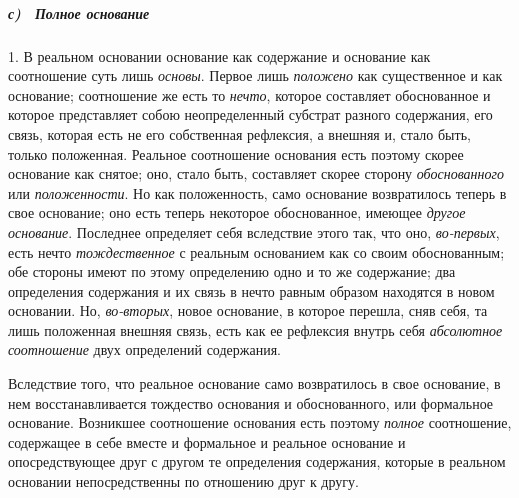 \subparagraph[с) \ Полное основание]{с) \ Полное основание}
1. В реальном основании основание как содержание
и основание как соотношение суть лишь {\em основы}.
Первое лишь {\em положено} как существенное и как
основание; соотношение же есть то {\em нечто}, которое
составляет обоснованное и которое представляет собою неопределенный
субстрат разного содержания, его связь, которая есть не его собственная
рефлексия, а внешняя и, стало быть, только положенная. Реальное соотношение
основания есть поэтому скорее основание как снятое; оно, стало быть,
составляет скорее сторону {\em обоснованного} или
{\em положенности}. Но как положенность, само основание
возвратилось теперь в свое основание; оно есть теперь некоторое
обоснованное, имеющее {\em другое основание}. Последнее
определяет себя вследствие этого так, что оно,
{\em во-первых}, есть нечто
{\em тождественное} с реальным основанием как со своим
обоснованным; обе стороны имеют по этому определению одно и то же
содержание; два определения содержания и их связь в нечто равным образом
находятся в новом основании. Но, {\em во-вторых}, новое
основание, в которое перешла, сняв себя, та лишь положенная внешняя связь,
есть как ее рефлексия внутрь себя {\em абсолютное
соотношение} двух определений содержания.

Вследствие того, что реальное основание само возвратилось в свое основание,
в нем восстанавливается тождество основания и обоснованного, или формальное
основание. Возникшее соотношение основания есть поэтому
{\em полное} соотношение, содержащее в себе вместе и
формальное и реальное основание и опосредствующее друг с другом те
определения содержания, которые в реальном основании непосредственны по
отношению друг к другу.

